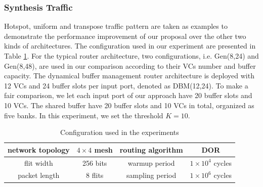 \documentclass[10pt,conference]{IEEEtran}
\begin{document}
\subsubsection{Synthesis Traffic}
Hotspot, uniform and transpose traffic pattern are taken as examples to demonstrate the performance improvement of our proposal over the other two kinds of architectures. The configuration used in our experiment are presented in Table \ref{config}. For the typical router architecture, two configurations, i.e. Gen(8,24) and Gen(8,48), are used in our comparison according to their VCs number and buffer capacity. The dynamical buffer management router architecture is deployed with 12 VCs and 24 buffer slots per input port, denoted as DBM(12,24). To make a fair comparison, we let each input port of our approach have 20 buffer slots and 10 VCs. The shared buffer have 20 buffer slots and 10 VCs in total, organized as five banks. In this experiment, we set the threshold $K=10$.

\begin{table}[htbp]
\centering
\caption{\label{arcpara}Configuration used in the experiments}\label{config}
\begin{tabular}{|c|c||c|c|}
\hline
network topology    & $4\times 4$ mesh  &   routing algorithm & DOR\\
\hline
flit width   & 256 bits & warmup period &   $1\times 10^4$ cycles\\
\hline
packet length & 8 flits & sampling period &   $1\times 10^6$ cycles\\
\hline
\end{tabular}
\end{table}
\end{document}

